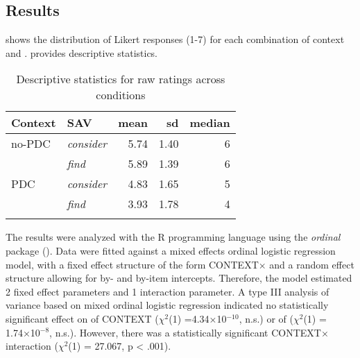 \documentclass[output=paper,colorlinks,citecolor=brown]{langscibook}
\begin{document}
\subsection{Results}
\label{sec:results:Fusco}

 shows the distribution of Likert responses (1-7) for each combination of context and .  provides descriptive statistics.

\begin{table}
\caption{Descriptive statistics for raw ratings across conditions}
\label{tab:descriptive_statistics:Fusco}
 \begin{tabularx}{.8\textwidth}{XX rrr}
  \lsptoprule
    Context & SAV & mean & sd & median \\
  \midrule
  no-PDC & \textit{consider} &   5.74  & 1.40 & 6\\
    & \textit{find} &  5.89  &  1.39 & 6\\
  PDC & \textit{consider} &   4.83  & 1.65 & 5\\
    & \textit{find} &   3.93 &   1.78 & 4\\
  \lspbottomrule
 \end{tabularx}
\end{table}

The results were analyzed with the R programming language using the \textit{ordinal} package (\cite{christiansen_ordinal_2023}). Data were fitted against a mixed effects ordinal logistic regression model, with a fixed effect structure of the form CONTEXT× and a random effect structure allowing for by- and by-item intercepts. Therefore, the model estimated 2 fixed effect parameters and 1 interaction parameter. A type III analysis of variance based on mixed ordinal logistic regression indicated no statistically significant effect on  of CONTEXT ($χ^2$(1) =4.34×10$^{−10}$, n.s.) or of  ($χ^2$(1) = 1.74×10$^{−8}$, n.s.). However, there was a statistically significant CONTEXT× interaction ($χ^2$(1) = 27.067, p < .001). 
\end{document}
